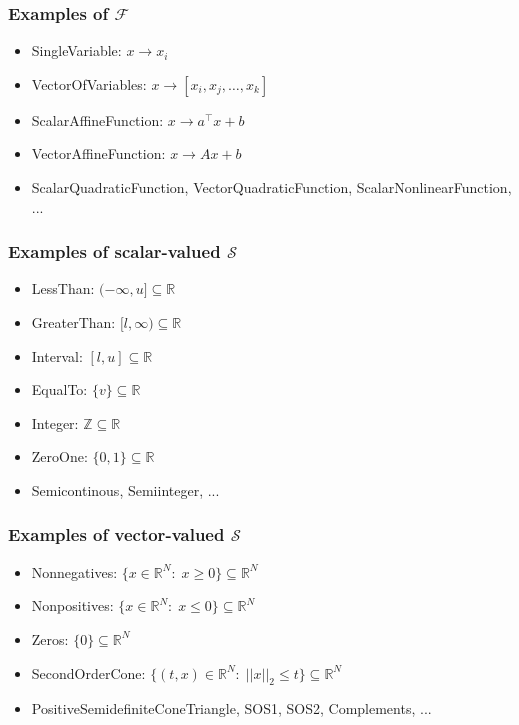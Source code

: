 \documentclass{beamer}
\begin{document}
\begin{frame}
  \frametitle{Examples of $\mathcal{F}$}
\begin{itemize}
    \item \textsf{SingleVariable}: $x \rightarrow x_i$
    \item \textsf{VectorOfVariables}: $x \rightarrow [x_i, x_j, \ldots, x_k]$
    \item \textsf{ScalarAffineFunction}: $x \rightarrow a^\top x + b$
    \item \textsf{VectorAffineFunction}: $x \rightarrow Ax + b$
    \item \textsf{ScalarQuadraticFunction}, \textsf{VectorQuadraticFunction}, \textsf{ScalarNonlinearFunction}, ...
\end{itemize}
\end{frame}

\begin{frame}
  \frametitle{Examples of scalar-valued $\mathcal{S}$}
\begin{itemize}
    \item \textsf{LessThan}: $(-\infty, u] \subseteq \mathbb{R}$
    \item \textsf{GreaterThan}: $[l, \infty) \subseteq \mathbb{R}$
    \item \textsf{Interval}: $[l, u] \subseteq \mathbb{R}$
    \item \textsf{EqualTo}: $\{v\} \subseteq \mathbb{R}$
    \item \textsf{Integer}: $\mathbb{Z} \subseteq \mathbb{R}$
    \item \textsf{ZeroOne}: $\{0, 1\} \subseteq \mathbb{R}$
    \item \textsf{Semicontinous}, \textsf{Semiinteger}, ...
\end{itemize}
\end{frame}

\begin{frame}
  \frametitle{Examples of vector-valued $\mathcal{S}$}
\begin{itemize}
    \item \textsf{Nonnegatives}: $\{x\in\mathbb{R}^N:\;x\ge0\} \subseteq \mathbb{R}^N$
    \item \textsf{Nonpositives}: $\{x\in\mathbb{R}^N:\;x\le0\} \subseteq \mathbb{R}^N$
    \item \textsf{Zeros}: $\{0\} \subseteq \mathbb{R}^N$
    \item \textsf{SecondOrderCone}: $\{(t,x) \in \mathbb{R}^{N}:\;||x||_2 \le t\} \subseteq \mathbb{R}^N$
    \item \textsf{PositiveSemidefiniteConeTriangle}, \textsf{SOS1}, \textsf{SOS2}, \textsf{Complements}, ...
\end{itemize}
\end{frame}
\end{document}
